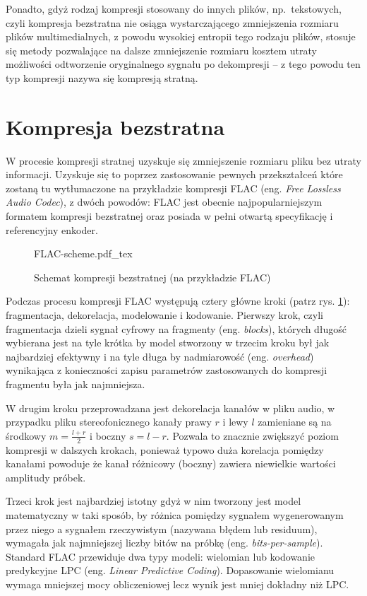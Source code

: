 \documentclass[pl,12pt]{aghdpl}
\let\Oldsection\section%
\renewcommand{\section}{\FloatBarrier\Oldsection}
\begin{document}
Ponadto, gdyż rodzaj kompresji stosowany do innych plików, np.\ tekstowych,
czyli kompresja bezstratna nie osiąga wystarczającego zmniejszenia rozmiaru
plików multimedialnych, z powodu wysokiej entropii tego rodzaju plików, stosuje
się metody pozwalające na dalsze zmniejszenie rozmiaru kosztem utraty
możliwości odtworzenie oryginalnego sygnału po dekompresji -- z tego powodu ten
typ kompresji nazywa się kompresją stratną.

\section{Kompresja bezstratna}

W procesie kompresji stratnej uzyskuje się zmniejszenie rozmiaru pliku bez
utraty informacji. Uzyskuje się to poprzez zastosowanie pewnych przekształceń
które zostaną tu wytłumaczone na przykładzie kompresji FLAC
(eng. \textit{Free Lossless Audio Codec}), z dwóch powodów: FLAC jest obecnie
najpopularniejszym formatem kompresji bezstratnej oraz posiada w pełni otwartą
specyfikację i referencyjny enkoder.

\begin{figure}[!tbh]
  \centering
  {FLAC-scheme.pdf_tex}
  \caption{Schemat kompresji bezstratnej (na przykładzie FLAC)}
  \label{fig:FLAC_scheme}
\end{figure}

Podczas procesu kompresji FLAC występują cztery główne kroki (patrz rys.
\ref{fig:FLAC_scheme}): fragmentacja, dekorelacja, modelowanie i kodowanie.
Pierwszy krok, czyli fragmentacja dzieli sygnał cyfrowy na fragmenty (eng.
\textit{blocks}), których długość wybierana jest na tyle krótka by model
stworzony w trzecim kroku był jak najbardziej efektywny i na tyle długa by
nadmiarowość (eng. \textit{overhead}) wynikająca z konieczności zapisu
parametrów zastosowanych do kompresji fragmentu była jak najmniejsza. 

W drugim kroku przeprowadzana jest dekorelacja kanałów w pliku audio, w
przypadku pliku stereofonicznego kanały prawy $r$ i lewy $l$ zamieniane są na środkowy
$m = \frac{l + r}{2}$ i boczny $s = l - r$. Pozwala to znacznie zwiększyć
poziom kompresji w dalszych krokach, ponieważ typowo duża korelacja pomiędzy
kanałami powoduje że kanał różnicowy (boczny) zawiera niewielkie wartości
amplitudy próbek.

Trzeci krok jest najbardziej istotny gdyż w nim tworzony jest model
matematyczny w taki sposób, by różnica pomiędzy sygnałem wygenerowanym przez
niego a sygnałem rzeczywistym (nazywana błędem lub residuum), wymagała
jak najmniejszej liczby bitów na próbkę (eng. \textit{bits-per-sample}).
Standard FLAC przewiduje dwa typy modeli: wielomian lub kodowanie predykcyjne
LPC (eng. \textit{Linear Predictive Coding}). Dopasowanie wielomianu wymaga
mniejszej mocy obliczeniowej lecz wynik jest mniej dokładny niż LPC.
\end{document}
